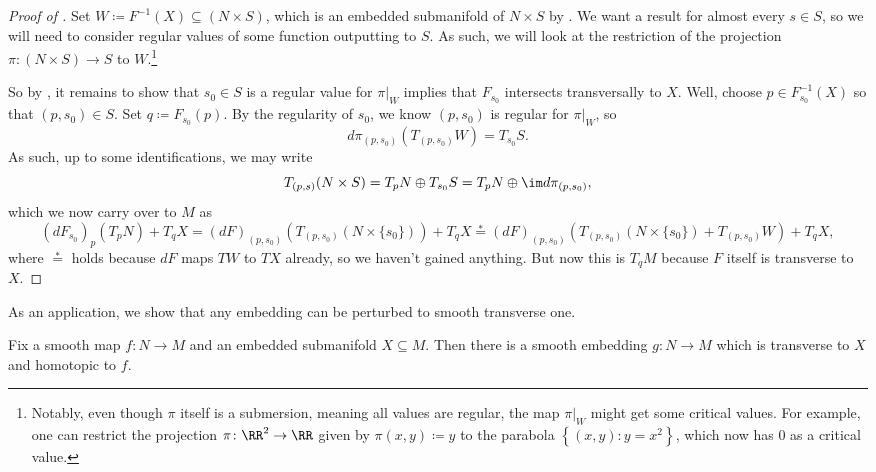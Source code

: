 \documentclass[../notes.tex]{subfiles}
\begin{document}
\begin{proof}[Proof of ]
	Set $W\coloneqq F^{-1}(X)\subseteq(N\times S)$, which is an embedded submanifold of $N\times S$ by . We want a result for almost every $s\in S$, so we will need to consider regular values of some function outputting to $S$. As such, we will look at the restriction of the projection $\pi\colon(N\times S)\to S$ to $W$.\footnote{Notably, even though $\pi$ itself is a submersion, meaning all values are regular, the map $\pi|_W$ might get some critical values. For example, one can restrict the projection $\pi\colon\RR^2\to\RR$ given by $\pi(x,y)\coloneqq y$ to the parabola $\left\{(x,y):y=x^2\right\}$, which now has $0$ as a critical value.}

	So by , it remains to show that $s_0\in S$ is a regular value for $\pi|_W$ implies that $F_{s_0}$ intersects transversally to $X$. Well, choose $p\in F^{-1}_{s_0}(X)$ so that $(p,s_0)\in S$. Set $q\coloneqq F_{s_0}(p)$. By the regularity of $s_0$, we know $(p,s_0)$ is regular for $\pi|_W$, so
	\[d\pi_{(p,s_0)}(T_{(p,s_0)}W)=T_{s_0}S.\]
	As such, up to some identifications, we may write
	\[T_{(p,s)}(N\times S)=T_pN\oplus T_{s_0}S=T_pN\oplus\im d\pi_{(p,s_0)},\]
	which we now carry over to $M$ as
	\[(dF_{s_0})_p(T_pN)+T_qX=(dF)_{(p,s_0)}(T_{(p,s_0)}(N\times\{s_0\}))+T_qX\stackrel*=(dF)_{(p,s_0)}(T_{(p,s_0)}(N\times\{s_0\})+T_{(p,s_0)}W)+T_qX,\]
	where $\stackrel*=$ holds because $dF$ maps $TW$ to $TX$ already, so we haven't gained anything. But now this is $T_qM$ because $F$ itself is transverse to $X$.
\end{proof}
As an application, we show that any embedding can be perturbed to smooth transverse one.
\begin{proposition}
	Fix a smooth map $f\colon N\to M$ and an embedded submanifold $X\subseteq M$. Then there is a smooth embedding $g\colon N\to M$ which is transverse to $X$ and homotopic to $f$.
\end{proposition}
\end{document}
